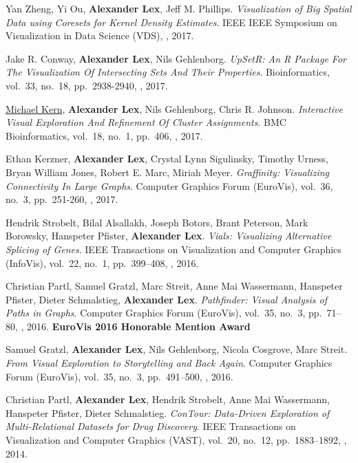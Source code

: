 \item Yan Zheng, Yi Ou, \textbf{Alexander Lex}, Jeff M. Phillips. \textit{Visualization of Big Spatial Data using Coresets for Kernel Density Estimates}. IEEE IEEE Symposium on Visualization in Data Science (VDS), , 2017. 
\item Jake R. Conway, \textbf{Alexander Lex}, Nils Gehlenborg. \textit{UpSetR: An R Package For The Visualization Of Intersecting Sets And Their Properties}. Bioinformatics, vol.\ 33, no.\ 18, pp.\ 2938-2940, , 2017. 
\item \uline{Michael Kern}, \textbf{Alexander Lex}, Nils Gehlenborg, Chris R. Johnson. \textit{Interactive Visual Exploration And Refinement Of Cluster Assignments}. BMC Bioinformatics, vol.\ 18, no.\ 1, pp.\ 406, , 2017. 
\item Ethan Kerzner, \textbf{Alexander Lex}, Crystal Lynn Sigulinsky, Timothy Urness, Bryan William Jones, Robert E. Marc, Miriah Meyer. \textit{Graffinity: Visualizing Connectivity In Large Graphs}. Computer Graphics Forum (EuroVis), vol.\ 36, no.\ 3, pp.\ 251-260, , 2017. 
\item Hendrik Strobelt, Bilal Alsallakh, Joseph Botors, Brant Peterson, Mark Borowsky, Hanspeter Pfister, \textbf{Alexander Lex}. \textit{Vials: Visualizing Alternative Splicing of Genes}. IEEE Transactions on Visualization and Computer Graphics (InfoVis), vol.\ 22, no.\ 1, pp.\ 399--408, , 2016. 
\item Christian Partl, Samuel Gratzl, Marc Streit, Anne Mai Wassermann, Hanspeter Pfister, Dieter Schmalstieg, \textbf{Alexander Lex}. \textit{Pathfinder: Visual Analysis of Paths in Graphs}. Computer Graphics Forum (EuroVis), vol.\ 35, no.\ 3, pp.\ 71--80, , 2016. \textbf{EuroVis 2016 Honorable Mention Award}
\item Samuel Gratzl, \textbf{Alexander Lex}, Nils Gehlenborg, Nicola Cosgrove, Marc Streit. \textit{From Visual Exploration to Storytelling and Back Again}. Computer Graphics Forum (EuroVis), vol.\ 35, no.\ 3, pp.\ 491--500, , 2016. 
\item Christian Partl, \textbf{Alexander Lex}, Hendrik Strobelt, Anne Mai Wassermann, Hanspeter Pfister, Dieter Schmalstieg. \textit{ConTour: Data-Driven Exploration of Multi-Relational Datasets for Drug Discovery}. IEEE Transactions on Visualization and Computer Graphics (VAST), vol.\ 20, no.\ 12, pp.\ 1883--1892, , 2014. 

